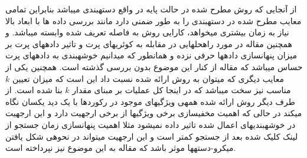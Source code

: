 \documentclass[10pt,a4paper]{article}
\newcommand{\نیمفاصله}{\halfspace}
\renewcommand{\ }{\halfspace}
\newcommand{\کا}{\lr{k-anonymity} }
\newcommand{\سا}{\lr{search log} }
\newcommand{\ما}{\lr{micro-aggregates} }
\begin{document}
از آنجایی که روش مطرح شده در حالت پایه در واقع دسته\ بندی می\ باشد بنابراین تمامی معایب مطرح شده در دسته\ بندی را به طور ضمنی دارد مانند بررسی داده ها با ابعاد بالا نیاز به زمان بیشتری میخواهد، کارایی روش به فاصله تعریف شده وابسته می\ باشد. و همچنین مقاله در مورد راه\ حل\ هایی در مقابله به کوئری\ های پرت و تاثیر داده\ های پرت بر میزان پنهان\ سازی داده\ ها حرفی نزده و همان\ طور که می\ دانیم خوشه\ بندی به داده\ های پرت حساس می\ باشد که مقاله از کنار این موضوع بدون بررسی گذشته است. همچنین یکی از معایب دیگری که می\ توان به روش ارائه شده نسبت داد این است که میزان تعیین $k$ مناسب نیز سخت می\ باشد که در اینجا کل عملیات بر مبنای مقدار $k$ بنا شده است. از طرف دیگر روش ارائه شده همه\ ی ویژگی\ های موجود در رکورد\ ها با یک دید یکسان نگاه می\ کند در حالی که اهمیت مخفی\ سازی برخی ویژگی\ ها از برخی ارجهیت دارد و این ارجهیت در خوشه\ بندی\ های اعمال شده تاثیر داده نمی\ شود مثلا اهمیت پنهان\ سازی زمان جستجو از لینک کلیک شده بعد از جستجو کمتر است و این ارجهیت می\ تواند در نحوه\ ی شکل یافتن میکرو-دسته\ ها موثر باشد که مقاله به این موضوع نیز نپرداخته است.
\end{document}
